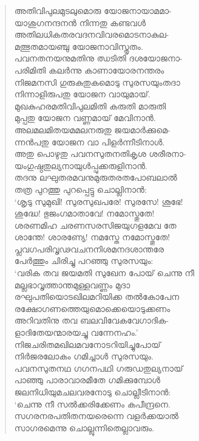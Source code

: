 \begin{verse}
അതിവിപുലമുടലുമൊരു യോജനായാമമാ-\\
യാശുഗനന്ദനന്‍ നിന്നതു കണ്ടവള്‍\\
അതിലധികതരവദനവിവരമൊടനാകുല-\\
മത്ഭുതമായഞ്ചു യോജനാവിസ്തൃതം.\\
പവനതനയനുമതിനു ഝടിതി ദശയോജനാ-\\
പരിമിതി കലര്‍ന്നു കാണായോരനന്തരം\\
നിജമനസി ഗുരുകുതുകമൊടു സുരസയുംതദാ\\
നിന്നാളിരുപതു യോജന വായുമായ്.\\
മുഖകുഹരമതിവിപുലമിതി കരുതി മാരുതി\\
മുപ്പതു യോജന വണ്ണമായ് മേവിനാന്‍.\\
അലമലമിതയമമലനരുതു ജയമാര്‍ക്കുമെ-\\
ന്നന്‍പതു യോജന വാ പിളര്‍ന്നീടിനാള്‍.\\
അതു പൊഴുതു പവനസുതനതികൃശ ശരീരനാ-\\
യംഗുഷ്ഠതുല്യനായുള്‍പ്പുക്കരുളിനാന്‍.\\
തദനു ലഘുതരമവനുമുരുതരതപോബലാല്‍\\
തത്ര പുറത്തു പുറപ്പെട്ടു ചൊല്ലിനാന്‍:\\
‘ശൃടു സുമുഖി! സുരസുഖപരേ! സുരസേ! ശൂഭേ!\\
ശുദ്ധേ! ഭുജംഗമാതാവേ! നമോസ്തുതേ!\\
ശരണമിഹ ചരണസരസിജയുഗളമേവ തേ\\
ശാന്തേ! ശാരണ്യേ! നമസ്തേ നമോസ്തുതേ!\\
പ്ലവഗപരിവൃഢവചനനിശമനദശാന്തരേ\\
പേര്‍ത്തും ചിരിച്ചു പറഞ്ഞു സുരസയും:\\
‘വരിക തവ ജയമതി സുഖേന പോയ് ചെന്നു നീ\\
മല്ലഭാവൃത്താന്തമുള്ളവണ്ണം മുദാ\\
രഘുപതിയൊടഖിലമറിയിക്ക തല്‍കോപേന\\
രക്ഷോഗണത്തെയുമൊക്കെയൊടുക്കണം\\
അറിവതിനു തവ ബലവിവേകവേഗാദിക-\\
ളാദിതേയന്മാരയച്ചു വന്നേനഹം.’\\
നിജചരിതമഖിലമവനോടറിയിച്ചുപോയ്\\
നിര്‍ജരലോകം ഗമിച്ചാള്‍ സുരസയും.\\
പവനസുതനഥ ഗഗനപഥി ഗരുഡതുല്യനായ്\\
പാഞ്ഞു പാരാവാരമീതേ ഗമിക്കുമ്പോള്‍\\
ജലനിധിയുമചലവരനോടു ചൊല്ലീടിനാന്‍:\\
‘ചെന്നു നീ സല്‍ക്കരിക്കേണം കപീന്ദ്രനെ.\\
സഗരനരപതിതനയരെന്നെ വളര്‍ക്കയാല്‍\\
സാഗരമെന്നു ചൊല്ലുന്നിതെല്ലാവരും.\\

\end{verse}
